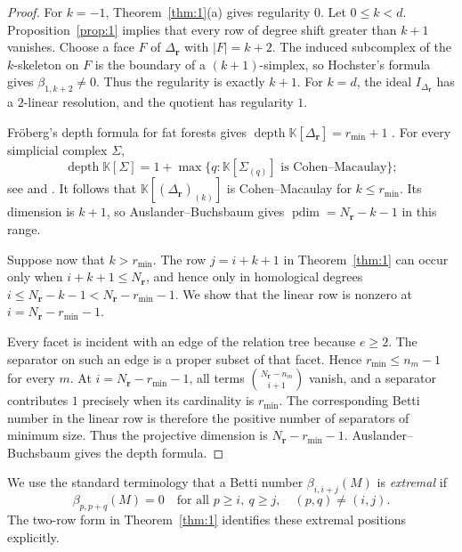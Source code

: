 \documentclass[11pt]{amsart}
\theoremstyle{definition}
\theoremstyle{remark}
\newcommand{\K}{\mathbb K}
\newcommand{\SR}[1]{\K[#1]}
\DeclareMathOperator{\pdim}{pdim}
\begin{document}
	\begin{proof}
		For $k=-1$, Theorem~\ref{thm:1}(a) gives regularity $0$. Let $0\le k<d$. Proposition~\ref{prop:1} implies that every row of degree shift greater than $k+1$ vanishes. Choose a face $F$ of $\Delta_{\mathbf r}$ with $|F|=k+2$. The induced subcomplex of the $k$-skeleton on $F$ is the boundary of a $(k+1)$-simplex, so Hochster's formula gives $\beta_{1,k+2}\ne0$. Thus the regularity is exactly $k+1$. For $k=d$, the ideal $I_{\Delta_{\mathbf r}}$ has a $2$-linear resolution, and the quotient has regularity $1$.
		
		Fr\"oberg's depth formula for fat forests gives $\operatorname{depth}\SR{\Delta_{\mathbf r}}=r_{\min}+1$ \cite{Fr1}. For every simplicial complex $\Sigma$,
		\[
		\operatorname{depth}\SR{\Sigma}
		=1+\max\{q:\SR{\Sigma_{(q)}}\text{ is Cohen--Macaulay}\};
		\]
		see \cite[Exercise~5.1.23]{BH98} and \cite{RV15}. It follows that $\SR{(\Delta_{\mathbf r})_{(k)}}$ is Cohen--Macaulay for $k\le r_{\min}$. Its dimension is $k+1$, so Auslander--Buchsbaum gives $\pdim=N_{\mathbf r}-k-1$ in this range.
		
		Suppose now that $k>r_{\min}$. The row $j=i+k+1$ in Theorem~\ref{thm:1} can occur only when $i+k+1\le N_{\mathbf r}$, and hence only in homological degrees $i\le N_{\mathbf r}-k-1<N_{\mathbf r}-r_{\min}-1$. We show that the linear row is nonzero at $i=N_{\mathbf r}-r_{\min}-1$.
		
		Every facet is incident with an edge of the relation tree because $e\ge2$. The separator on such an edge is a proper subset of that facet. Hence $r_{\min}\le n_m-1$ for every $m$. At $i=N_{\mathbf r}-r_{\min}-1$, all terms $\binom{N_{\mathbf r}-n_m}{i+1}$ vanish, and a separator contributes $1$ precisely when its cardinality is $r_{\min}$. The corresponding Betti number in the linear row is therefore the positive number of separators of minimum size. Thus the projective dimension is $N_{\mathbf r}-r_{\min}-1$. Auslander--Buchsbaum gives the depth formula.
	\end{proof}
	
	We use the standard terminology that a Betti number $\beta_{i,i+j}(M)$ is \emph{extremal} if
	\[
	\beta_{p,p+q}(M)=0
	\quad\text{for all }p\ge i,\ q\ge j,
	\quad (p,q)\ne(i,j).
	\]
	The two-row form in Theorem~\ref{thm:1} identifies these extremal positions explicitly.
	
\end{document}
